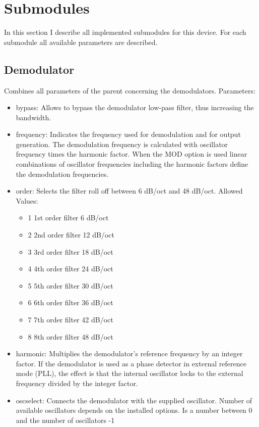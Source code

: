 \documentclass[11pt]{article} %
\begin{document}
\section{Submodules}

In this section I describe all implemented submodules for this device. For each submodule all available parameters are described.

\subsection{Demodulator}
	Combines all parameters of the parent concerning the demodulators. Parameters:
	\begin{itemize}
	\item bypass: Allows to bypass the demodulator low-pass filter, thus increasing the bandwidth.
	\item frequency: Indicates the frequency used for demodulation and for output generation. The demodulation frequency is calculated with oscillator frequency times the harmonic factor. When the MOD option is used linear combinations of oscillator frequencies including the harmonic factors define the demodulation frequencies.
	\item order: Selects the filter roll off between 6 dB/oct and 48 dB/oct. Allowed Values:
	\begin{itemize}
	\itemsep0pt
	\item 1 1st order filter 6 dB/oct
	\item 2 2nd order filter 12 dB/oct
	\item 3 3rd order filter 18 dB/oct
	\item 4 4th order filter 24 dB/oct
	\item 5 5th order filter 30 dB/oct
	\item 6 6th order filter 36 dB/oct
	\item 7 7th order filter 42 dB/oct
	\item 8 8th order filter 48 dB/oct
	\end{itemize}
	\item harmonic: Multiplies the demodulator's reference frequency by an integer factor. If the demodulator is used as a phase detector in external reference mode (PLL), the effect is that the internal oscillator locks to the external frequency divided by the integer factor.
	\item oscselect: Connects the demodulator with the supplied oscillator. Number of available oscillators depends on the installed options. Is a number between 0 and the number of oscillators -1

\end{itemize}
\end{document}
